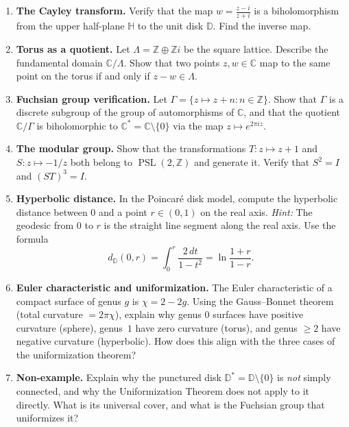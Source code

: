 \begin{enumerate}

    \item \textbf{The Cayley transform.} Verify that the map $w = \frac{z - i}{z + i}$ is a biholomorphism from the upper half-plane $\mathbb{H}$ to the unit disk $\mathbb{D}$. Find the inverse map.

    \item \textbf{Torus as a quotient.} Let $\Lambda = \mathbb{Z} \oplus \mathbb{Z}i$ be the square lattice. Describe the fundamental domain $\mathbb{C}/\Lambda$. Show that two points $z, w \in \mathbb{C}$ map to the same point on the torus if and only if $z - w \in \Lambda$.

    \item \textbf{Fuchsian group verification.} Let $\Gamma = \{z \mapsto z + n : n \in \mathbb{Z}\}$. Show that $\Gamma$ is a discrete subgroup of the group of automorphisms of $\mathbb{C}$, and that the quotient $\mathbb{C}/\Gamma$ is biholomorphic to $\mathbb{C}^* = \mathbb{C} \setminus \{0\}$ via the map $z \mapsto e^{2\pi i z}$.

    \item \textbf{The modular group.} Show that the transformations $T \colon z \mapsto z + 1$ and $S \colon z \mapsto -1/z$ both belong to $\operatorname{PSL}(2,\mathbb{Z})$ and generate it. Verify that $S^2 = I$ and $(ST)^3 = I$.

    \item \textbf{Hyperbolic distance.} In the Poincar\'e disk model, compute the hyperbolic distance between $0$ and a point $r \in (0,1)$ on the real axis. \emph{Hint:} The geodesic from $0$ to $r$ is the straight line segment along the real axis. Use the formula
    \[
        d_{\mathbb{D}}(0, r) = \int_0^r \frac{2\,dt}{1 - t^2} = \ln\frac{1 + r}{1 - r}.
    \]

    \item \textbf{Euler characteristic and uniformization.} The Euler characteristic of a compact surface of genus $g$ is $\chi = 2 - 2g$. Using the Gauss--Bonnet theorem (total curvature $= 2\pi\chi$), explain why genus $0$ surfaces have positive curvature (sphere), genus~$1$ have zero curvature (torus), and genus $\geq 2$ have negative curvature (hyperbolic). How does this align with the three cases of the uniformization theorem?

    \item \textbf{Non-example.} Explain why the punctured disk $\mathbb{D}^* = \mathbb{D} \setminus \{0\}$ is \emph{not} simply connected, and why the Uniformization Theorem does not apply to it directly. What is its universal cover, and what is the Fuchsian group that uniformizes it?

\end{enumerate}
